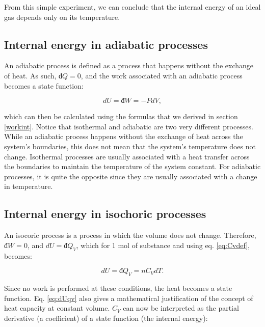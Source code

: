 \documentclass[
  9pt,
]{extbook}
\theoremstyle{definition}
\theoremstyle{definition}
\theoremstyle{definition}
\theoremstyle{remark}
\begin{document}
From this simple experiment, we can conclude that the internal energy of an ideal gas depends only on its temperature.

\hypertarget{internal-energy-in-adiabatic-processes}{%
\subsection{Internal energy in adiabatic processes}\label{internal-energy-in-adiabatic-processes}}

An adiabatic process is defined as a process that happens without the exchange of heat. As such, \(đ Q=0\), and the work associated with an adiabatic process becomes a state function:

\begin{equation}
  dU=đ W=-PdV,
  \label{eq:dUadiabatic}
\end{equation}

which can then be calculated using the formulas that we derived in section \ref{workint}. Notice that isothermal and adiabatic are two very different processes. While an adiabatic process happens without the exchange of heat across the system's boundaries, this does not mean that the system's temperature does not change. Isothermal processes are usually associated with a heat transfer across the boundaries to maintain the temperature of the system constant. For adiabatic processes, it is quite the opposite since they are usually associated with a change in temperature.

\hypertarget{internal-energy-in-isochoric-processes}{%
\subsection{Internal energy in isochoric processes}\label{internal-energy-in-isochoric-processes}}

An isocoric process is a process in which the volume does not change. Therefore, \(đ W=0\), and \(dU = đ Q_V\), which for 1 mol of substance and using eq. \eqref{eq:Cvdef}, becomes:

\begin{equation}
  dU = đ Q_V = n C_V dT.
  \label{eq:dUqv}
\end{equation}

Since no work is performed at these conditions, the heat becomes a state function. Eq. \eqref{eq:dUqv} also gives a mathematical justification of the concept of heat capacity at constant volume. \(C_V\) can now be interpreted as the partial derivative (a coefficient) of a state function (the internal energy):
\end{document}

